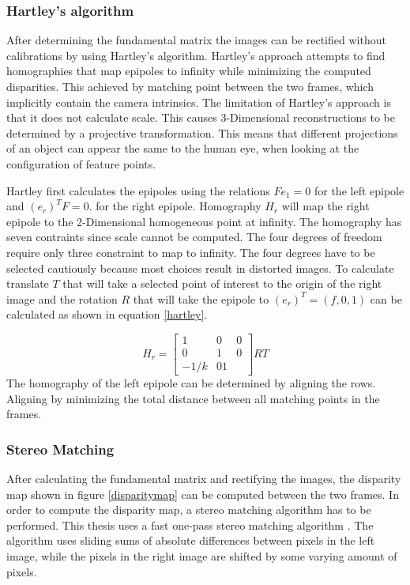\documentclass[a4paper]{article}
\begin{document}
\subsubsection{Hartley's algorithm}
After determining the fundamental matrix the images can be rectified without calibrations by using Hartley's algorithm. Hartley's approach attempts to find homographies \cite{Trucco1998} that map epipoles to infinity while minimizing the computed disparities. This achieved by matching point between the two frames, which implicitly contain the camera intrinsics. The limitation of Hartley's approach is that it does not calculate scale. This causes 3-Dimensional reconstructions to be determined by a projective transformation. This means 
that different projections of an object can appear the same to the human eye, when looking at the configuration of feature points.

Hartley first calculates the epipoles using the relations $Fe_1 = 0$ for the left epipole and $(e_r)^T F = 0$. for the right epipole. Homography $H_r$ will map the right epipole to the 2-Dimensional homogeneous point at infinity. The homography has seven contraints since scale cannot be computed. The four degrees of freedom require only three constraint to map to infinity. The four degrees have to be selected cautiously because most choices result in distorted images. 
To calculate translate $T$ that will take a selected point of interest to the origin of the right image and the rotation $R$ that will take the epipole to $(e_r)^T = ( f,0,1)$ can be calculated as shown in equation \ref{hartley}.

\begin{equation}
\label{hartley}
H_r = \begin{bmatrix}
1 & 0 & 0\\
0 & 1 & 0\\
-1/k & 0 1
\end{bmatrix}RT
\end{equation}
The homography of the left epipole can be determined by aligning the rows. Aligning by minimizing the total distance between all matching points in the frames.

\subsubsection{Stereo Matching}
After calculating the fundamental matrix and rectifying the images, the disparity map shown in figure \ref{disparitymap} can be computed between the two frames. In order to compute the disparity map, a stereo matching algorithm has to be performed. This thesis uses a fast one-pass stereo matching algorithm \cite{Gutmann2000}. The algorithm uses sliding sums of absolute differences between pixels in the left image, while the pixels in the right image are shifted by some varying amount of pixels.
\end{document}
